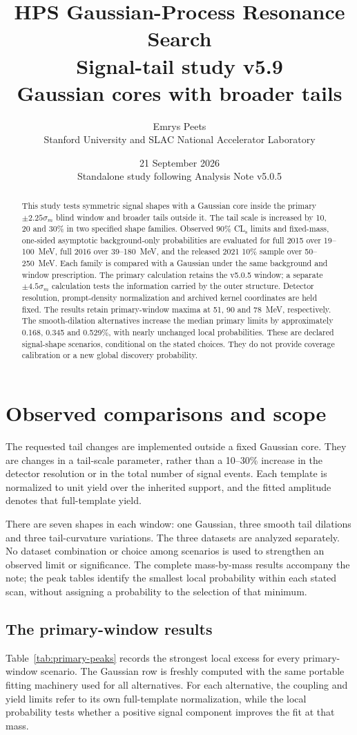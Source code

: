 \documentclass[11pt]{article}
\title{HPS Gaussian-Process Resonance Search\\[0.5em]
 \large Signal-tail study v5.9\\
 Gaussian cores with broader tails}
\author{Emrys Peets\\Stanford University and SLAC National Accelerator Laboratory}
\date{21 September 2026\\\normalsize Standalone study following Analysis Note v5.0.5}
\newcommand{\CLs}{CL$_{\mathrm{s}}$}
\newcommand{\sig}{\sigma_m}
\begin{document}
\maketitle
\begin{abstract}
This study tests symmetric signal shapes with a Gaussian core inside the
primary $\pm2.25\sig$ blind window and broader tails outside it. The tail
scale is increased by 10, 20 and 30\% in two specified shape families.
Observed 90\% \CLs{} limits and fixed-mass, one-sided asymptotic
background-only probabilities are evaluated for full 2015 over 19--100~MeV,
full 2016 over 39--180~MeV, and the released 2021 10\% sample over
50--250~MeV. Each family is compared with a Gaussian under the same
background and window prescription. The primary calculation retains the
v5.0.5 window; a separate $\pm4.5\sig$ calculation tests the information
carried by the outer structure. Detector resolution, prompt-density
normalization and archived kernel coordinates are held fixed. The results
retain primary-window maxima at 51, 90 and 78~MeV, respectively. The
smooth-dilation alternatives increase the median primary limits by
approximately 0.168, 0.345 and 0.529\%, with nearly unchanged local
probabilities. These are declared signal-shape scenarios, conditional on the stated choices.
They do not provide coverage calibration or a new global discovery probability.
\end{abstract}

\section{Observed comparisons and scope}
The requested tail changes are implemented outside a fixed Gaussian core.
They are changes in a tail-scale parameter, rather than a 10--30\% increase
in the detector resolution or in the total number of signal events. Each
template is normalized to unit yield over the inherited support, and the
fitted amplitude denotes that full-template yield.

There are seven shapes in each window: one Gaussian, three smooth tail
dilations and three tail-curvature variations. The three datasets are
analyzed separately. No dataset combination or choice among scenarios is
used to strengthen an observed limit or significance. The complete
mass-by-mass results accompany the note; the peak tables identify the
smallest local probability within each stated scan, without assigning a
probability to the selection of that minimum.

\clearpage
\subsection{The primary-window results}
Table~\ref{tab:primary-peaks} records the strongest local excess for every
primary-window scenario. The Gaussian row is freshly computed with the
same portable fitting machinery used for all alternatives. For each
alternative, the coupling and yield limits refer to its
own full-template normalization, while the local probability tests whether
a positive signal component improves the fit at that mass.
\end{document}
